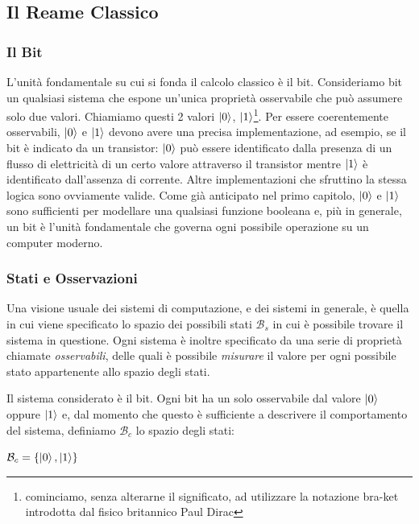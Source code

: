 \documentclass[12pt,a4paper,openright]{report}
\begin{document}
\subsection{Il Reame Classico}

\subsubsection{Il Bit}
L'unità fondamentale su cui si fonda il calcolo classico è il bit. Consideriamo bit un qualsiasi sistema che 
espone un'unica proprietà osservabile che può assumere solo due valori. Chiamiamo questi 2 valori $\ket0$, $\ket1$\footnote{cominciamo, senza alterarne il significato, ad utilizzare la notazione bra-ket introdotta dal fisico britannico Paul Dirac}.
Per essere coerentemente osservabili, $\ket0$ e $\ket1$ devono avere una precisa implementazione, ad esempio, se il bit è indicato
da un transistor: $\ket0$ può essere identificato dalla presenza di un flusso di elettricità di un certo valore attraverso il transistor mentre
$\ket1$ è identificato dall'assenza di corrente. Altre implementazioni che sfruttino la stessa logica sono ovviamente valide. 
Come già anticipato nel primo capitolo, $\ket0$ e $\ket1$ sono sufficienti per modellare una qualsiasi
funzione booleana e, più in generale, un bit è l'unità fondamentale che governa ogni possibile
operazione su un computer moderno.

\subsubsection{Stati e Osservazioni}

Una visione usuale dei sistemi di computazione, e dei sistemi in generale, è quella in cui viene specificato lo spazio dei possibili
stati $\mathcal{B}_s$ in cui è possibile trovare il sistema in questione. Ogni sistema è inoltre specificato da una serie di proprietà chiamate \emph{osservabili},
delle quali è possibile \emph{misurare} il valore per ogni possibile stato appartenente allo spazio degli stati. \par

Il sistema considerato è il bit. Ogni bit ha un solo osservabile dal valore $\ket0$ oppure $\ket1$ e, dal momento che questo è sufficiente a descrivere 
il comportamento del sistema, definiamo $\mathcal{B}_c$ lo spazio degli stati:
\begin{center}
    $ \mathcal{B}_c = \{\ket0, \ket1 \}$
\end{center}
\end{document}
